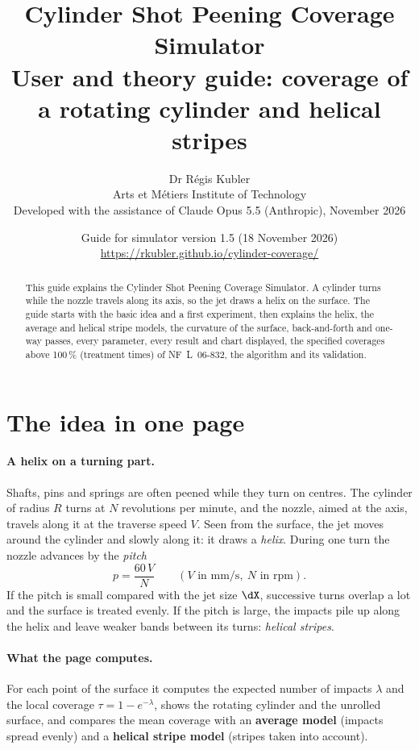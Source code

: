 \documentclass[11pt,a4paper]{article}
\title{\textbf{Cylinder Shot Peening Coverage Simulator}\\[3pt]
\large User and theory guide: coverage of a rotating cylinder and helical stripes}
\author{Dr Régis Kubler\\ Arts et Métiers Institute of Technology\\[4pt]
\small Developed with the assistance of Claude Opus 5.5 (Anthropic), November 2026}
\date{Guide for simulator version 1.5 (18 November 2026)\\ \url{https://rkubler.github.io/cylinder-coverage/}}
\begin{document}
\maketitle
\thispagestyle{fancy}

\begin{abstract}
\noindent This guide explains the Cylinder Shot Peening Coverage Simulator. A cylinder turns while the nozzle travels along its axis, so the jet draws a helix on the surface. The guide starts with the basic idea and a first experiment, then explains the helix, the average and helical stripe models, the curvature of the surface, back-and-forth and one-way passes, every parameter, every result and chart displayed, the specified coverages above 100\,\% (treatment times) of NF~L~06-832, the algorithm and its validation.
\end{abstract}

\tableofcontents

\section{The idea in one page}

\paragraph{A helix on a turning part.} Shafts, pins and springs are often peened while they turn on centres. The cylinder of radius $R$ turns at $N$ revolutions per minute, and the nozzle, aimed at the axis, travels along it at the traverse speed $V$. Seen from the surface, the jet moves around the cylinder and slowly along it: it draws a \emph{helix}. During one turn the nozzle advances by the \emph{pitch}
\begin{equation}
\boxed{p=\frac{60\,V}{N}}\qquad(V\text{ in mm/s},\ N\text{ in rpm}).
\end{equation}
If the pitch is small compared with the jet size $\dX$, successive turns overlap a lot and the surface is treated evenly. If the pitch is large, the impacts pile up along the helix and leave weaker bands between its turns: \emph{helical stripes}.

\paragraph{What the page computes.} For each point of the surface it computes the expected number of impacts $\lambda$ and the local coverage $\tau=1-e^{-\lambda}$, shows the rotating cylinder and the unrolled surface, and compares the mean coverage with an \textbf{average model} (impacts spread evenly) and a \textbf{helical stripe model} (stripes taken into account).
\end{document}
